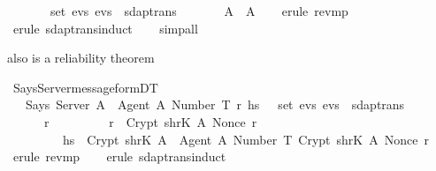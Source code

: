 \begin{isabellebody}
  \ \ \ \ \ {\isasymrbrace}\ {\isasymin}\ set\ evs{\isacharsemicolon}\ evs\ {\isasymin}\ sdaptrans\ {\isasymrbrakk}\isanewline
  \ \ \ \ \ {\isasymLongrightarrow}\ A{\isacharprime}\ {\isacharequal}\ A{\isachardoublequoteclose}\isanewline
  \isadelimproof
  \isanewline
  \ \ %
  \endisadelimproof
  \isatagproof
  \isamarkupfalse%
  \ {\isacharparenleft}erule\ rev{\isacharunderscore}mp{\isacharparenright}\isanewline
  \ \ \isamarkupfalse%
  \ {\isacharparenleft}erule\ sdaptrans{\isachardot}induct{\isacharparenright}\isanewline
  \ \ \isamarkupfalse%
  \ {\isacharparenleft}simp{\isacharunderscore}all{\isacharparenright}\isanewline
  \isamarkupfalse%
  \endisatagproof
  {\isafoldproof}%
  \isadelimproof
  \endisadelimproof
  \begin{isamarkuptext}%
   also is a reliability theorem%
  \end{isamarkuptext}\isamarkuptrue%
  \isamarkupfalse%
  \ Says{\isacharunderscore}Server{\isacharunderscore}message{\isacharunderscore}form{\isacharunderscore}DT{}\ {\isacharcolon}\isanewline
  \ \ {\isachardoublequoteopen}{\isasymlbrakk}\ Says\ Server\ A\ {\isasymlbrace}\ {\isasymlbrace}Agent\ A{\isacharcomma}\ Number\ T{\isasymrbrace}{\isacharcomma}\ r{\isacharprime}{\isacharcomma}\ h\isactrlsub s\ {\isasymrbrace}\ {\isasymin}\ set\ evs{\isacharsemicolon}\ evs\ {\isasymin}\ sdaptrans\ {\isasymrbrakk}\isanewline
  \ \ \ \ {\isasymLongrightarrow}\ {\isacharparenleft}{\isasymexists}\ r{\isachardot}\isanewline
  \ \ \ \ \ \ \ \ \ r{\isacharprime}\ {\isacharequal}\ Crypt\ {\isacharparenleft}shrK\ A{\isacharparenright}\ {\isacharparenleft}Nonce\ r{\isacharparenright}\ {\isasymand}\isanewline
  \ \ \ \ \ \ \ \ \ h\isactrlsub s\ {\isacharequal}\ Crypt\ {\isacharparenleft}shrK\ A{\isacharparenright}\ {\isasymlbrace}\ {\isasymlbrace}Agent\ A{\isacharcomma}\ Number\ T{\isasymrbrace}{\isacharcomma}\ Crypt\ {\isacharparenleft}shrK\ A{\isacharparenright}\ {\isacharparenleft}Nonce\ r{\isacharparenright}\ {\isasymrbrace}{\isacharparenright}{\isachardoublequoteclose}\isanewline
  \isadelimproof
  \isanewline
  \ \ %
  \endisadelimproof
  \isatagproof
  \isamarkupfalse%
  \ {\isacharparenleft}erule\ rev{\isacharunderscore}mp{\isacharparenright}\isanewline
  \ \ \isamarkupfalse%
  \ {\isacharparenleft}erule\ sdaptrans{\isachardot}induct{\isacharparenright}\isanewline
  \ \ \isamarkupfalse%

\end{isabellebody}
